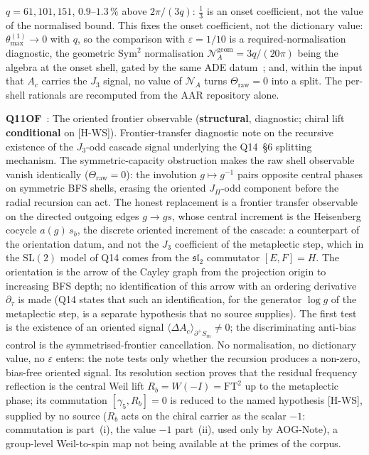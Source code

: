 \documentclass[11pt,a4paper]{article}
\newcommand{\sstruct}{\textcolor{cstruct}{\textbf{structural}}}
\newcommand{\scond}{\textcolor{ccond}{\textbf{conditional}}}
\begin{document}
    $q = 61,101,151$, $0.9$--$1.3\,\%$ above $2\pi/(3q)$: $\tfrac13$ is an onset coefficient, not the value of the
    normalised bound.
    This fixes the onset coefficient, not the dictionary value: $\theta_{\max}^{(1)} \to 0$ with $q$, so the comparison
    with $\varepsilon = 1/10$ is a required-normalisation diagnostic, the geometric $\mathrm{Sym}^2$ normalisation
    $\mathcal{N}_A^{\mathrm{geom}} = 3q/(20\pi)$ being the algebra at the onset shell, gated by the same ADE
    datum~\cite{Beau2026aog}; and, within the input that $A_c$ carries the $J_3$ signal, no value of $\mathcal{N}_A$
    turns $\Theta_{\mathrm{raw}} = 0$ into a split.
    The per-shell rationals are recomputed from the AAR repository alone.

    \textbf{Q11OF}~\cite{Beau2026q11of}: The oriented frontier observable (\sstruct, diagnostic; chiral lift \scond{}
    on [H-WS]).
    Frontier-transfer diagnostic note on the recursive existence of the $J_3$-odd cascade signal
    underlying the Q14~\S6 splitting mechanism. The symmetric-capacity obstruction makes the raw
    shell observable vanish identically ($\Theta_{\mathrm{raw}} = 0$): the involution
    $g \mapsto g^{-1}$ pairs opposite central phases on symmetric BFS shells, erasing the
    oriented $J_\Pi$-odd component before the radial recursion can act. The honest replacement is
    a frontier transfer observable on the directed outgoing edges $g \to gs$, whose central
    increment is the Heisenberg cocycle $a(g)\,s_b$, the discrete oriented increment of the cascade:
    a counterpart of the orientation datum, and not the $J_3$ coefficient of the metaplectic step, which in the
    $\mathrm{SL}(2)$ model of Q14 comes from the $\mathfrak{sl}_2$ commutator $[E,F]=H$.
    The orientation is the arrow of the Cayley graph from the projection origin to increasing BFS depth; no
    identification of this arrow with an ordering derivative $\partial_\tau$ is made (Q14 states that such an
    identification, for the generator $\log g$ of the metaplectic step, is a separate hypothesis that no source
    supplies). The first test is the existence of an
    oriented signal $\langle \Delta A_c \rangle_{\partial^+ S_m} \neq 0$; the discriminating
    anti-bias control is the symmetrised-frontier cancellation. No normalisation, no dictionary
    value, no $\varepsilon$ enters: the note tests only whether the recursion produces a non-zero,
    bias-free oriented signal.
    Its resolution section proves that the residual frequency reflection is the central Weil lift
    $R_b = W(-I) = \mathrm{FT}^2$ up to the metaplectic phase; its commutation $[\gamma_5, R_b] = 0$ is reduced to the
    named hypothesis [H-WS], supplied by no source ($R_b$ acts on the chiral carrier as the scalar $-1$: commutation
    is part~(i), the value $-1$ part~(ii), used only by AOG-Note), a group-level Weil-to-spin map not being available
    at the primes of the corpus.
\end{document}
